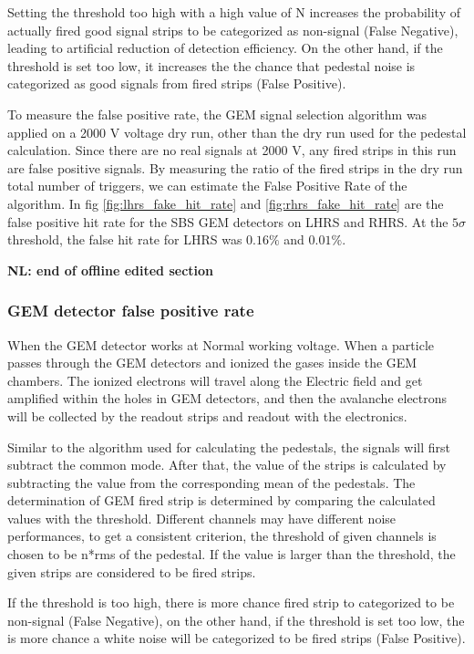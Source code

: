 Setting the threshold   too high with a high value of N increases the probability of  actually  fired 
good signal  strips to  be categorized as  non-signal  (False Negative), leading to artificial reduction 
of detection efficiency.  On the other hand, if the threshold is set too low, it increases the the 
 chance that pedestal  noise is categorized as good signals from fired strips (False Positive). 

To measure the false positive rate, the GEM signal selection algorithm was applied on a 2000 V voltage 
dry run, other than the dry run used for the pedestal calculation. Since there are no real signals  at 
2000 V,  any fired strips in this run are false positive signals. By measuring the ratio of the fired 
strips in the dry run total number of triggers, we can estimate the False Positive Rate of the algorithm. 
In fig \ref{fig:lhrs_fake_hit_rate} and \ref{fig:rhrs_fake_hit_rate} are the false positive  hit rate 
for the SBS GEM detectors on LHRS and RHRS. At the $5\sigma$ threshold, the false hit rate for LHRS 
was $0.16\%$ and $0.01\%$.

{\bf NL: end of offline edited section}

\subsubsection{GEM detector false positive rate}

When the GEM detector works at Normal working voltage. When a particle passes through  the GEM detectors and ionized the gases inside the GEM chambers. The ionized electrons will travel along the Electric field and get amplified within the holes in GEM detectors, and then the avalanche electrons will be collected by the readout strips and readout with the electronics. 

Similar to the algorithm used for calculating the pedestals, the signals will first subtract the common mode. After that, the value of the strips is calculated by subtracting the value from the corresponding mean of the pedestals. The determination of GEM fired strip is determined by comparing the calculated values with the threshold. Different channels may have different noise performances, to get a consistent criterion, the threshold of given channels is chosen to be n*rms of the pedestal. If the value is larger than the threshold, the given strips are considered to be fired strips. 

If the threshold is too high, there is more chance fired strip to categorized to be non-signal (False Negative), on the other hand, if the threshold is set too low, the is more chance a white noise will be categorized to be fired strips (False Positive). 

